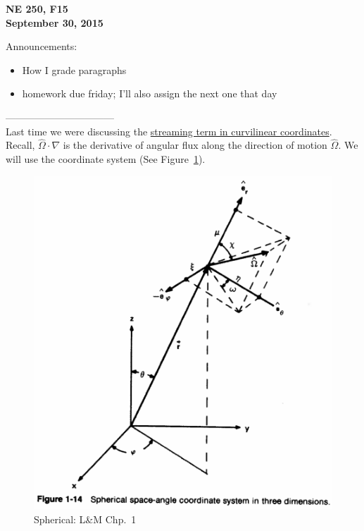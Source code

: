 \documentclass[12pt]{article}
\newcommand{\vOmega}{\ensuremath{\hat{\Omega}}}
\begin{document}
\begin{center}
{\bf NE 250, F15\\
September 30, 2015 
}
\end{center}

Announcements:
\begin{itemize}
\item How I grade paragraphs
\item homework due friday; I'll also assign the next one that day
\end{itemize}

---------------------------------\\
Last time we were discussing the \underline{streaming term in curvilinear coordinates}.
Recall, $\vOmega \cdot \nabla$ is the derivative of angular flux along the direction of motion $\vOmega$. We will use the coordinate system (See Figure~\ref{fig:sph-coord}).
%
\begin{figure}[h!]
    \begin{center}
    \includegraphics[keepaspectratio, width = 3.5 in]{../figs/spherical-coords}
    \end{center}    
    \label{fig:sph-coord} 
    \caption{Spherical: L\&M Chp.\ 1}
\end{figure}
\end{document}

